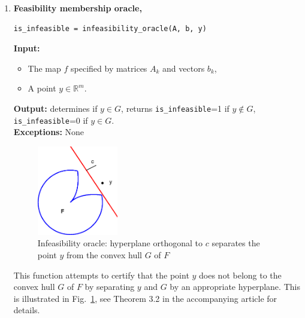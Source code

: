 \documentclass[a4paper]{article}
\theoremstyle{definition}
\begin{document}
\begin{enumerate}
\item {\bf Feasibility membership oracle,\hskip 6pt}
\begin{verbatim}
is_infeasible = infeasibility_oracle(A, b, y)
\end{verbatim}
{\bf Input:}
\begin{itemize}
\item The map $f$ specified by matrices $A_k$ and vectors $b_k$,
\item A point $y\in\mathbb{R}^m$.
\end{itemize}
{\bf Output:} determines if $y\in G$, returns {\tt is\_infeasible}=1 if $y\notin G$, {\tt is\_infeasible}=0 if $y\in G$.\\
{\bf Exceptions:} None

\begin{figure}[H]
	\centering\includegraphics[width=100pt]{fig/infeasibility_oracle}
	\caption{Infeasibility oracle: hyperplane orthogonal to $c$ separates the point $y$ from the convex hull $G$ of $F$}
\label{fig:one}
\end{figure}

This function attempts to certify that the point $y$ does not belong to the convex hull $G$ of $F$ by separating $y$ and $G$ by an appropriate hyperplane.
This is illustrated in Fig.~\ref{fig:one}, see Theorem 3.2 in the accompanying article for details.


\end{enumerate}
\end{document}
